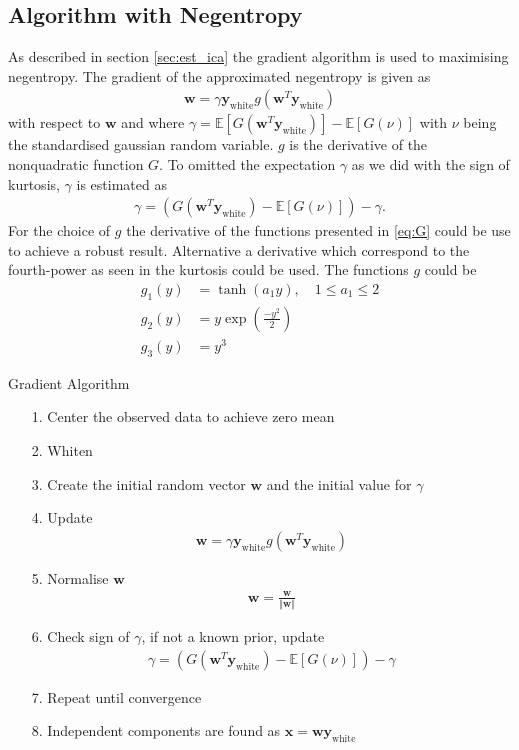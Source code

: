 \subsection{Algorithm with Negentropy}
As described in section \ref{sec:est_ica} the gradient algorithm is used to maximising negentropy. The gradient of the approximated negentropy is given as
\begin{align*}
\mathbf{w} = \gamma \mathbf{y}_{\text{white}} g(\mathbf{w}^T \mathbf{y}_{\text{white}})
\end{align*}
with respect to $\mathbf{w}$ and where $\gamma = \mathbb{E}[G(\mathbf{w}^T \mathbf{y}_{\text{white}})] - \mathbb{E}[G(\nu)]$ with $\nu$ being the standardised gaussian random variable. $g$ is the derivative of the nonquadratic function $G$. To omitted the expectation $\gamma$ as we did with the sign of kurtosis, $\gamma$ is estimated as
\begin{align*}
\gamma = (G(\mathbf{w}^T \mathbf{y}_{\text{white}}) - \mathbb{E}[G(\nu)]) - \gamma.
\end{align*}
For the choice of $g$ the derivative of the functions presented in \eqref{eq:G} could be use to achieve a robust result. Alternative a derivative which correspond to the fourth-power as seen in the kurtosis could be used. The functions $g$ could be
\begin{align}\label{eq:G}
g_1 (y) &= \tanh (a_1 y), \quad 1 \leq a_1 \leq 2 \\
g_2 (y) &= y \exp\left( \frac{-y^2}{2} \right) \nonumber \\
g_3 (y) &= y^3 \nonumber
\end{align}

\begin{algorithm}[H]
\caption{Gradient Algorithm}
\begin{itemize}
\item[1.] Center the observed data to achieve zero mean
\item[2.] Whiten 
\item[3.] Create the initial random vector $\mathbf{w}$ and the initial value for $\gamma$
\item[4.] Update
\begin{align*}
\mathbf{w} = \gamma \mathbf{y}_{\text{white}} g(\mathbf{w}^T \mathbf{y}_{\text{white}})
\end{align*}
\item[5.] Normalise $\mathbf{w}$
\begin{align*}
\mathbf{w} = \frac{\mathbf{w}}{\Vert \mathbf{w} \Vert}
\end{align*}
\item[6.] Check sign of $\gamma$, if not a known prior, update
\begin{align*}
\gamma = (G(\mathbf{w}^T \mathbf{y}_{\text{white}}) - \mathbb{E}[G(\nu)]) - \gamma
\end{align*}
\item[7.] Repeat until convergence
\item[8.] Independent components are found as $\mathbf{x} = \mathbf{w} \mathbf{y}_{\text{white}}$
\end{itemize}
\end{algorithm}

